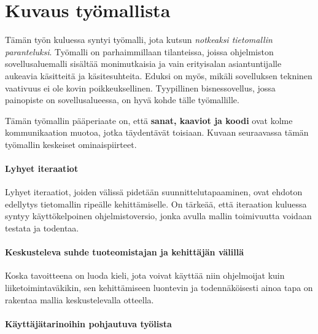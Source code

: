 \pagebreak

\hypertarget{kuvaus-tyuxf6mallista}{%
\chapter{Kuvaus työmallista}\label{kuvaus-tyuxf6mallista}}

Tämän työn kuluessa syntyi työmalli, jota kutsun \emph{notkeaksi
tietomallin paranteluksi}. Työmalli on parhaimmillaan tilanteissa,
joissa ohjelmiston sovellusaluemalli sisältää monimutkaisia ja vain
erityisalan asiantuntijalle aukeavia käsitteitä ja käsitesuhteita.
Eduksi on myös, mikäli sovelluksen tekninen vaativuus ei ole kovin
poikkeuksellinen. Tyypillinen bisnessovellus, jossa painopiste on
sovellusalueessa, on hyvä kohde tälle työmallille.

Tämän työmallin pääperiaate on, että \textbf{sanat, kaaviot ja koodi}
ovat kolme kommunikaation muotoa, jotka täydentävät toisiaan. Kuvaan
seuraavassa tämän työmallin keskeiset ominaispiirteet.

\hypertarget{lyhyet-iteraatiot}{%
\subsubsection{Lyhyet iteraatiot}\label{lyhyet-iteraatiot}}

Lyhyet iteraatiot, joiden välissä pidetään suunnittelutapaaminen, ovat
ehdoton edellytys tietomallin ripeälle kehittämiselle. On tärkeää, että
iteraation kuluessa syntyy käyttökelpoinen ohjelmistoversio, jonka
avulla mallin toimivuutta voidaan testata ja todentaa.

\hypertarget{keskusteleva-suhde-tuoteomistajan-ja-kehittuxe4juxe4n-vuxe4lilluxe4}{%
\subsubsection{Keskusteleva suhde tuoteomistajan ja kehittäjän
välillä}\label{keskusteleva-suhde-tuoteomistajan-ja-kehittuxe4juxe4n-vuxe4lilluxe4}}

Koska tavoitteena on luoda kieli, jota voivat käyttää niin ohjelmoijat
kuin liiketoimintaväkikin, sen kehittämiseen luontevin ja
todennäköisesti ainoa tapa on rakentaa mallia keskustelevalla otteella.

\hypertarget{kuxe4yttuxe4juxe4tarinoihin-pohjautuva-tyuxf6lista}{%
\subsubsection{Käyttäjätarinoihin pohjautuva
työlista}\label{kuxe4yttuxe4juxe4tarinoihin-pohjautuva-tyuxf6lista}}

